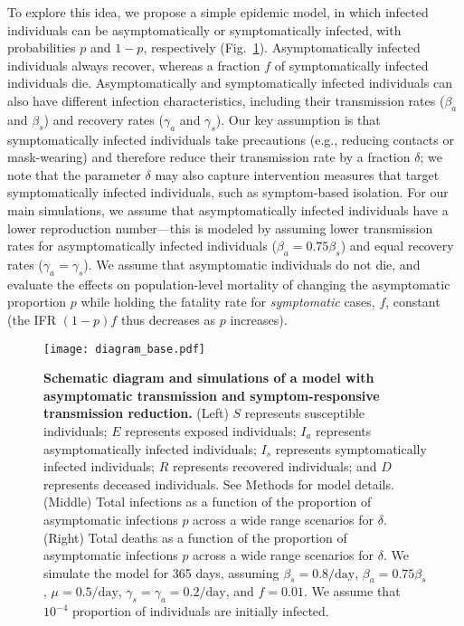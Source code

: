 \documentclass[12pt]{article}
\newcommand{\fref}[1]{Fig.~\ref{fig:#1}}
\begin{document}
To explore this idea, we propose a simple epidemic model,
in which infected individuals can be asymptomatically or symptomatically infected, with probabilities $p$ and $1-p$, respectively (\fref{base}).  
Asymptomatically infected individuals always recover, whereas a fraction $f$ of symptomatically infected individuals die.
Asymptomatically and symptomatically infected individuals can also have different infection characteristics, including their transmission rates ($\beta_a$ and $\beta_s$) and recovery rates ($\gamma_a$ and $\gamma_s$).
Our key assumption is that symptomatically infected individuals take precautions (e.g., reducing contacts or mask-wearing) and therefore reduce their transmission rate by a fraction $\delta$;
we note that the parameter $\delta$ may also capture intervention measures that target symptomatically infected individuals, such as symptom-based isolation. 
For our main simulations, we assume that asymptomatically infected individuals have a lower reproduction number---this is modeled by assuming lower transmission rates for asymptomatically infected individuals ($\beta_a = 0.75 \beta_s$) and equal recovery rates ($\gamma_a = \gamma_s$).
We assume that asymptomatic individuals do not die, and evaluate the effects on population-level mortality of changing the asymptomatic proportion $p$ while holding the fatality rate for \emph{symptomatic} cases, $f$, constant (the IFR $(1-p)f$ thus decreases as $p$ increases).
\begin{figure}[!ht]
\texttt{[image: diagram\_base.pdf]}
\caption{
\textbf{Schematic diagram and simulations of a model with asymptomatic transmission and symptom-responsive transmission reduction.}
(Left) $S$ represents susceptible individuals; $E$ represents exposed individuals; $I_a$ represents asymptomatically infected individuals; $I_s$ represents symptomatically infected individuals; $R$ represents recovered individuals; and $D$ represents deceased individuals. See Methods for model details.
(Middle) Total infections as a function of the proportion of asymptomatic infections $p$ across a wide range scenarios for $\delta$.
(Right) Total deaths as a function of the proportion of asymptomatic infections $p$ across a wide range scenarios for $\delta$.
We simulate the model for 365 days, assuming $\beta_s = 0.8/\mathrm{day}$, $\beta_a = 0.75 \beta_s$, $\mu=0.5/\mathrm{day}$, $\gamma_s=\gamma_a=0.2/\mathrm{day}$, and $f=0.01$.
We assume that $10^{-4}$ proportion of individuals are initially infected.
}
\label{fig:base}
\end{figure}
\end{document}
